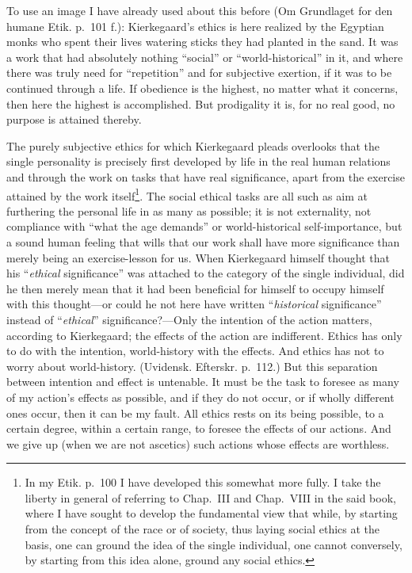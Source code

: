 \documentclass[12pt,a4paper]{book}
\newcommand{\opage}[1]{\marginnote{\footnotesize\textit{[#1]}}}
\begin{document}
To use an image I have already used about this before
(Om Grundlaget for den humane Etik. p.~101 f.): Kierkegaard's ethics is
here realized by the Egyptian monks who spent their lives watering sticks
they had planted in the sand. It was a work that had absolutely nothing
``social'' or ``world-historical'' in it, and where there was truly need
for ``repetition'' and for subjective exertion, if it was to be continued
through a life. If obedience is the highest, no matter what it concerns,
then here the highest is accomplished. But
\opage{105}prodigality it is, for no real good, no purpose is attained
thereby.

The purely subjective ethics for which Kierkegaard pleads overlooks that
the single personality is precisely first developed by life in the real
human relations and through the work on tasks that have real significance,
apart from the exercise attained by the work itself\footnote{In my Etik.
p.~100 I have developed this somewhat more fully. I take the liberty in
general of referring to Chap.~III and Chap.~VIII in the said book, where I
have sought to develop the fundamental view that while, by starting from
the concept of the race or of society, thus laying social ethics at the
basis, one can ground the idea of the single individual, one cannot
conversely, by starting from this idea alone, ground any social ethics.}.
The social ethical tasks are all such as aim at furthering the personal
life in as many as possible; it is not externality, not compliance with
``what the age demands'' or world-historical self-importance, but a sound
human feeling that wills that our work shall have more significance than
merely being an exercise-lesson for us. When Kierkegaard himself thought
that his ``\textit{ethical} significance'' was attached to the category of
the single individual, did he then merely mean that it had been beneficial
for himself to occupy himself with this thought---or could he not here
have written ``\textit{historical} significance'' instead of
``\textit{ethical}'' significance?---Only the intention of the action
matters, according to Kierkegaard; the effects of the action are
indifferent. Ethics has only to do with the intention, world-history with
the effects. And ethics has not to worry about world-history.
(Uvidensk. Efterskr. p.~112.) But this separation between intention and
effect is untenable. It must be the task to foresee as many of my
\opage{106}action's effects as possible, and if they do not occur, or if
wholly different ones occur, then it can be my fault. All ethics rests on
its being possible, to a certain degree, within a certain range, to
foresee the effects of our actions. And we give up (when we are not
ascetics) such actions whose effects are worthless.
\end{document}
